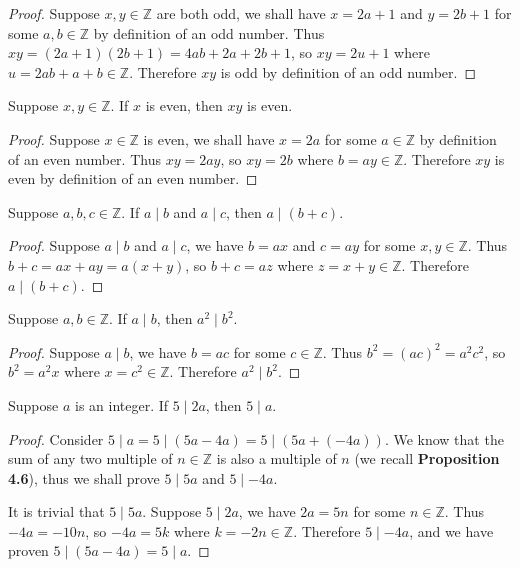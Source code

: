 \documentclass{exam}
\begin{document}
\begin{proof}
    Suppose $x, y \in \mathbb{Z}$ are both odd, we shall have $x = 2a +1$ and $y = 2b+1$ for some $a,b\in\mathbb{Z}$ by definition of an odd number. Thus $xy=(2a+1)(2b+1)=4ab+2a+2b+1$, so $xy = 2u+1$ where $u=2ab+a+b \in \mathbb{Z}$. Therefore $xy$ is odd by definition of an odd number.
\end{proof}

\begin{proposition}{4.5}
    Suppose $x,y\in\mathbb{Z}$. If $x$ is even, then $xy$ is even.
\end{proposition}

\begin{proof}
    Suppose $x\in\mathbb{Z}$ is even, we shall have $x = 2a$ for some $a\in\mathbb{Z}$ by definition of an even number. Thus $xy = 2ay$, so $xy = 2b$ where $b = ay \in \mathbb{Z}$. Therefore $xy$ is even by definition of an even number.
\end{proof}

\begin{proposition}{4.6}
    Suppose $a, b, c\in\mathbb{Z}$. If $a\mid b$ and $a\mid c$, then $a\mid(b+c)$.
\end{proposition}

\begin{proof}
    Suppose $a \mid b$ and $a \mid c$, we have $b = ax$ and $c = ay$ for some $x, y\in\mathbb{Z}$. Thus $b + c = ax + ay = a(x+y)$, so $b+c = az$ where $z = x + y \in \mathbb{Z}$. Therefore $a\mid(b+c)$.
\end{proof}

\begin{proposition}{4.7}
    Suppose $a, b\in\mathbb{Z}$. If $a \mid b$, then $a^2\mid b^2$.
\end{proposition}

\begin{proof}
    Suppose $a \mid b$, we have $b = ac$ for some $c\in\mathbb{Z}$. Thus $b^2=(ac)^2 = a^2c^2$, so $b^2 = a^2x$ where $x = c^2 \in \mathbb{Z}$. Therefore $a^2 \mid b^2$.
\end{proof}

\begin{proposition}{4.8}
    Suppose $a$ is an integer. If $5 \mid 2a$, then $5 \mid a$.
\end{proposition}

\begin{proof}
    Consider $5 \mid a = 5 \mid (5a - 4a) = 5 \mid (5a + (-4a))$. We know that the sum of any two multiple of $n \in \mathbb{Z}$ is also a multiple of $n$ (we recall \textbf{Proposition 4.6}), thus we shall prove $5 \mid 5a$ and $5 \mid -4a$.

    It is trivial that $5 \mid 5a$. Suppose $5 \mid 2a$, we have $2a = 5n$ for some $n\in\mathbb{Z}$. Thus $-4a = -10n$, so $-4a = 5k$ where $k =-2n\in\mathbb{Z}$. Therefore $5\mid-4a$, and we have proven $5\mid (5a-4a) = 5\mid a$.
\end{proof}
\end{document}
